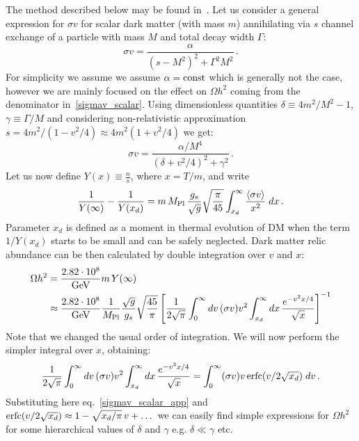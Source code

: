 \documentclass[12pt,twoside]{article}
\begin{document}
The method described below may be found in~\cite{DuchGrzadkowski}. Let us consider a general expression for $\sigma v$ for scalar dark matter (with mass $m$) annihilating via $s$ channel exchange of a particle with mass $M$ and total decay width $\Gamma$: 
\begin{equation}
\label{sigmav_scalar}
\sigma v = \frac{\alpha}{(s-M^2)^2+\Gamma^2M^2}\,.
\end{equation}
For simplicity we assume we assume $\alpha = \rm const$ which is generally not the case, however we are mainly focused on the effect on $\Omega h^2$ coming from the denominator in~\eqref{sigmav_scalar}. Using dimensionless quantities $\delta\equiv 4m^2/M^2-1$, $\gamma\equiv\Gamma/M$ and considering non-relativistic approximation $s=4m^2/(1-v^2/4)\approx 4m^2(1+v^2/4)$ we get:
\begin{equation}
\label{sigmav_scalar_app}
\sigma v = \frac{\alpha/M^4}{(\delta+v^2/4)^2+\gamma^2}\,.
\end{equation}
Let us now define $Y(x)\equiv\frac{n}{s}$, where $x=T/m$, and write
\begin{equation}
\frac{1}{Y(\infty)} - \frac{1}{Y(x_d)}=
m\,M_{\rm Pl}\,\frac{g_s}{\sqrt{g}}\sqrt{\frac{\pi}{45}}
\int_{x_d}^\infty \frac{\langle\sigma v\rangle}{x^2}\;dx\,.
\end{equation}
Parameter $x_d$ is defined as a moment in thermal evolution of DM when the term $1/Y(x_d)$ starts to be small and can be safely neglected. Dark matter relic abundance can be then calculated by double integration over $v$ and $x$:
\begin{align}
\Omega h^2 &= \frac{2.82\cdot 10^8}{\rm GeV}m\,Y(\infty)\\
&\approx
\frac{2.82\cdot 10^8}{\rm GeV}\frac{1}{M_{\rm Pl}}
\frac{\sqrt{g}}{g_s}\sqrt{\frac{45}{\pi}}
\left[
\frac{1}{2\sqrt{\pi}}
\int_0^\infty dv\,(\sigma v)v^2
\int_{x_d}^\infty dx\,\frac{e^{-v^2x/4}}{\sqrt{x}}
\right]^{-1}
\end{align}
Note that we changed the usual order of integration. We will now perform the simpler integral over $x$, obtaining:
\begin{equation}
\frac{1}{2\sqrt{\pi}}
\int_0^\infty dv\,(\sigma v)v^2
\int_{x_d}^\infty dx\,\frac{e^{-v^2x/4}}{\sqrt{x}}=
\int_0^\infty(\sigma v)v\,{\rm erfc}(v/2\sqrt{x_d})\;dv\,.
\end{equation}
Substituting here eq.~\eqref{sigmav_scalar_app} and ${\rm erfc}(v/2\sqrt{x_d})\approx 1-\sqrt{x_d/\pi}\,v+\dots$ we can easily find simple expressions for $\Omega h^2$ for some hierarchical values of $\delta$ and $\gamma$ e.g. $\delta\ll\gamma$ etc.
\end{document}
